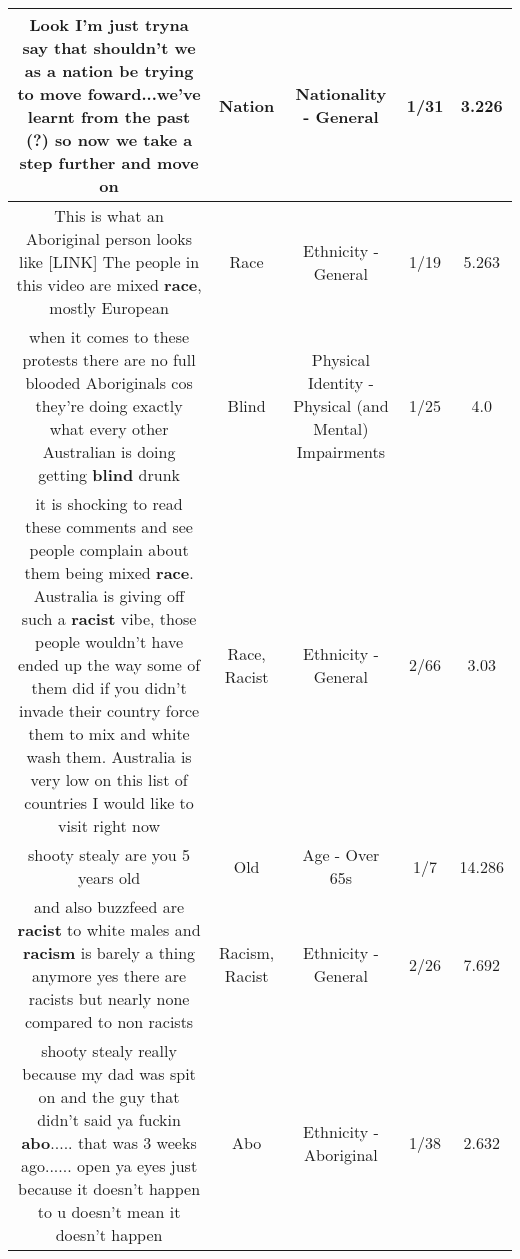 \documentclass[11pt]{article}
\newlength\mylength
\begin{document}
\begin{center}
\begin{longtable}{|C{.65\mylength}|C{.30\mylength}|C{.12\mylength}|C{.12\mylength}|C{.12\mylength}|}
  \small Look I'm just tryna say that shouldn't we as a \textbf{nation} be trying to move foward...we've learnt from the past (?) so now we take a step further and move on\normalsize   & Nation & Nationality - General & 1/31 & 3.226 \\  \hline
  \small This is what an Aboriginal person looks like  [LINK] The people in this video are mixed \textbf{race}, mostly European\normalsize   & Race & Ethnicity - General & 1/19 & 5.263 \\  \hline
  \small when it comes to these protests there are no full blooded Aboriginals cos they're doing exactly what every other Australian is doing getting \textbf{blind} drunk\normalsize   & Blind & Physical Identity - Physical (and Mental) Impairments & 1/25 & 4.0 \\  \hline
  \small it is shocking to read these comments and see people complain about them being mixed \textbf{race}. Australia is giving off such a \textbf{racist} vibe, those people wouldn't have ended up the way some of them did if you didn't invade their country force them to mix and white wash them. Australia is very low on this list of countries I would like to visit right now\normalsize   & Race, Racist & Ethnicity - General & 2/66 & 3.03 \\  \hline
  \small shooty stealy are you 5 years old\normalsize   & Old & Age - Over 65s & 1/7 & 14.286 \\  \hline
  \small and also buzzfeed are \textbf{racist} to white males and \textbf{racism} is barely a thing anymore yes there are racists but nearly none compared to non racists\normalsize   & Racism, Racist & Ethnicity - General & 2/26 & 7.692 \\  \hline
  \small shooty stealy really because my dad was spit on and the guy that didn't said ya fuckin \textbf{abo}..... that was 3 weeks ago...... open ya eyes just because it doesn't happen to u doesn't mean it doesn't happen\normalsize   & Abo & Ethnicity - Aboriginal & 1/38 & 2.632 \\  \hline

\end{longtable}
\end{center}
\end{document}
